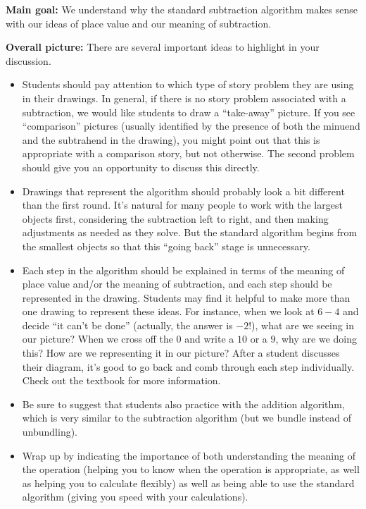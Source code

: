 \documentclass[nooutcomes,noauthor]{ximera}
\begin{document}
\begin{instructorNotes} 



{\bf Main goal:} We understand why the standard subtraction algorithm makes sense with our ideas of place value and our meaning of subtraction.


{\bf Overall picture:} There are several important ideas to highlight in your discussion.

\begin{itemize}
	\item Students should pay attention to which type of story problem they are using in their drawings. In general, if there is no story problem associated with a subtraction, we would like students to draw a ``take-away'' picture. If you see ``comparison'' pictures (usually identified by the presence of both the minuend and the subtrahend in the drawing), you might point out that this is appropriate with a comparison story, but not otherwise. The second problem should give you an opportunity to discuss this directly.
	\item Drawings that represent the algorithm should probably look a bit different than the first round. It's natural for many people to work with the largest objects first, considering the subtraction left to right, and then making adjustments as needed as they solve. But the standard algorithm begins from the smallest objects so that this ``going back'' stage is unnecessary.
	\item Each step in the algorithm should be explained in terms of the meaning of place value and/or the meaning of subtraction, and each step should be represented in the drawing. Students may find it helpful to make more than one drawing to represent these ideas. For instance, when we look at $6-4$ and decide ``it can't be done'' (actually, the answer is $-2$!), what are we seeing in our picture? When we cross off the $0$ and write a $10$ or a $9$, why are we doing this? How are we representing it in our picture? After a student discusses their diagram, it's good to go back  and comb through each step individually. Check out the textbook for more information.
	\item Be sure to suggest that students also practice with the addition algorithm, which is very similar to the subtraction algorithm (but we bundle instead of unbundling).
	\item Wrap up by indicating the importance of both understanding the meaning of the operation (helping you to know when the operation is appropriate, as well as helping you to calculate flexibly) as well as being able to use the standard algorithm (giving you speed with your calculations). 
\end{itemize}


\end{instructorNotes}
\end{document}
